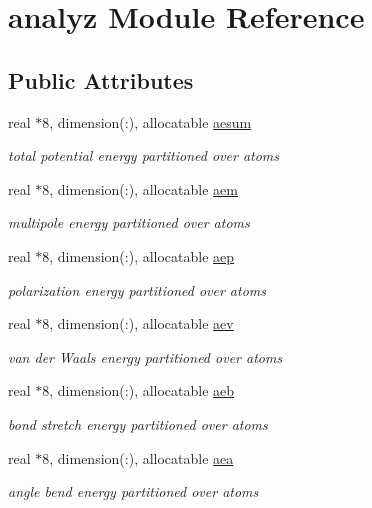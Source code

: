 \hypertarget{classanalyz}{\section{analyz Module Reference}
\label{classanalyz}
}
\subsection*{Public Attributes}
\begin{DoxyCompactItemize}
\item 
real $\ast$8, dimension(\-:), allocatable \hyperlink{classanalyz_ad018e9bf5a6ab57c2b6f25028947cbee}{aesum}
\begin{DoxyCompactList}\small\item\em total potential energy partitioned over atoms \end{DoxyCompactList}\item 
real $\ast$8, dimension(\-:), allocatable \hyperlink{classanalyz_a3a36c16946fae85aa6fa8857979a7ad7}{aem}
\begin{DoxyCompactList}\small\item\em multipole energy partitioned over atoms \end{DoxyCompactList}\item 
real $\ast$8, dimension(\-:), allocatable \hyperlink{classanalyz_a3666f68e7b39a56e10a22329fc53f77c}{aep}
\begin{DoxyCompactList}\small\item\em polarization energy partitioned over atoms \end{DoxyCompactList}\item 
real $\ast$8, dimension(\-:), allocatable \hyperlink{classanalyz_a094d7b549db557c404fc69d900039b5e}{aev}
\begin{DoxyCompactList}\small\item\em van der Waals energy partitioned over atoms \end{DoxyCompactList}\item 
real $\ast$8, dimension(\-:), allocatable \hyperlink{classanalyz_a73f838c7494055151eeb31399db8561b}{aeb}
\begin{DoxyCompactList}\small\item\em bond stretch energy partitioned over atoms \end{DoxyCompactList}\item 
real $\ast$8, dimension(\-:), allocatable \hyperlink{classanalyz_a9c92e4260e1ed258793aa037b42472d1}{aea}
\begin{DoxyCompactList}\small\item\em angle bend energy partitioned over atoms \end{DoxyCompactList}\item 

\end{DoxyCompactItemize}
